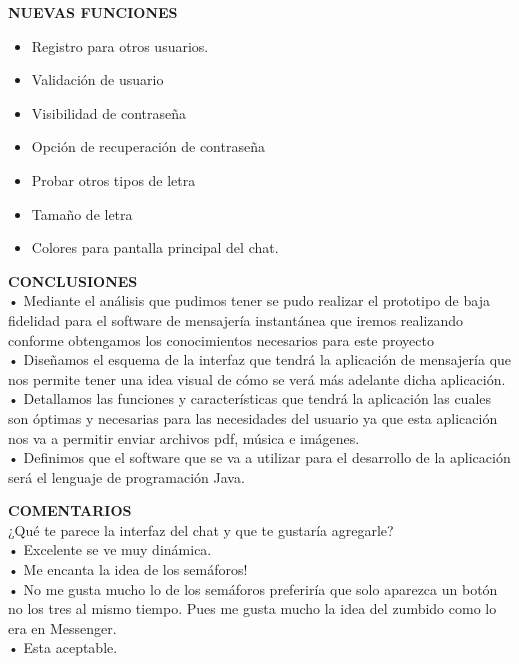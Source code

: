 \documentclass[11pt,a4paper]{report}
\begin{document}
\textbf{NUEVAS FUNCIONES}\vspace{0,5cm}
\begin{itemize}
\item Registro para otros usuarios. 
\item Validación de usuario
\item Visibilidad de contraseña
\item Opción de recuperación de contraseña
\item Probar otros tipos de letra
\item Tamaño de letra
\item Colores para pantalla principal del chat.

\end{itemize}\newpage




\textbf{CONCLUSIONES}\newline\\ 

•	Mediante el análisis que pudimos tener se pudo realizar el prototipo de baja fidelidad para el software de mensajería instantánea que iremos realizando  conforme obtengamos los conocimientos necesarios para este proyecto\newline\\ 

•	Diseñamos el esquema de la interfaz que tendrá la aplicación de mensajería que nos permite tener una idea visual de cómo se verá más adelante dicha aplicación.\newline\\ 


•	Detallamos  las funciones y características que tendrá la aplicación las cuales son óptimas y necesarias  para las necesidades del usuario  ya que esta aplicación nos va a permitir enviar archivos pdf, música e imágenes.\newline\\ 


•	Definimos que el software que se va a utilizar para el desarrollo de la aplicación será el lenguaje de programación Java.\newpage

\textbf{COMENTARIOS} \newline\\

¿Qué te parece la interfaz del chat y que te gustaría agregarle?\newline\\

• Excelente se ve muy dinámica.\newline\\

• Me encanta la idea de los semáforos!\newline\\

• No me gusta mucho lo de los semáforos preferiría que solo aparezca un botón no los\vspace{0,5cm} tres al mismo tiempo. 
Pues me gusta mucho la idea del zumbido como lo era en Messenger.\newline\\

• Esta aceptable.
\end{document}
